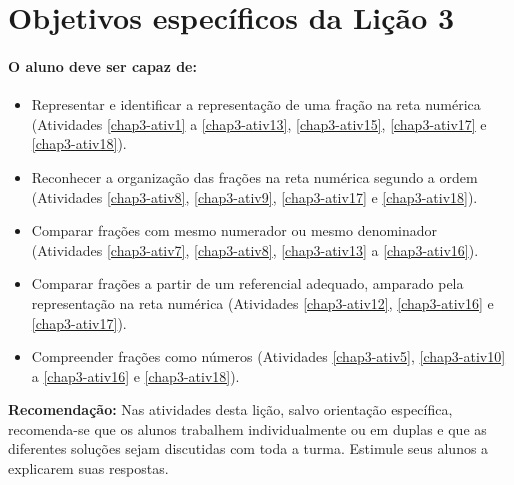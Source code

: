 \section{Objetivos específicos da Lição 3}
\paragraph{O aluno deve ser capaz de:}


  \begin{itemize}
   \item Representar e identificar a representação de uma fração na reta numérica (Atividades \ref{chap3-ativ1} a \ref{chap3-ativ13}, \ref{chap3-ativ15}, \ref{chap3-ativ17} e \ref{chap3-ativ18}). 
   \item Reconhecer a organização das frações na reta numérica segundo a ordem (Atividades \ref{chap3-ativ8}, \ref{chap3-ativ9}, \ref{chap3-ativ17} e \ref{chap3-ativ18}). 
   \item Comparar frações com mesmo numerador ou mesmo denominador (Atividades \ref{chap3-ativ7}, \ref{chap3-ativ8}, \ref{chap3-ativ13} a \ref{chap3-ativ16}).
   \item Comparar frações a partir de um referencial adequado, amparado pela representação na reta numérica (Atividades \ref{chap3-ativ12}, \ref{chap3-ativ16} e \ref{chap3-ativ17}).
\item Compreender frações como números (Atividades \ref{chap3-ativ5}, \ref{chap3-ativ10} a \ref{chap3-ativ16} e \ref{chap3-ativ18}). 
  \end{itemize}

\textbf{Recomendação:}  Nas atividades desta lição, salvo orientação específica, recomenda-se que os alunos trabalhem individualmente ou em duplas e que as diferentes soluções sejam discutidas com toda a turma. Estimule seus alunos a explicarem suas respostas.


